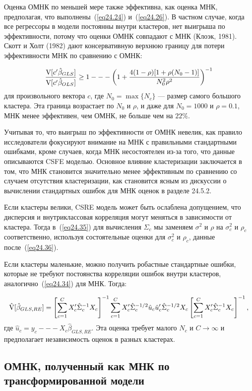 Оценка ОМНК по меньшей мере также эффективна, как оценка МНК, предполагая, что выполнены~(\ref{eq24.24}) и~(\ref{eq24.26}). В частном случае, когда все регрессоры в модели постоянны внутри кластеров, нет выигрыша по эффективности, потому что оценки ОМНК совпадают с МНК (Клоэк, 1981). Скотт и Холт (1982) дают консервативную верхнюю границу для потери эффективности МНК по сравнению с ОМНК:

$$
\frac{\mathrm{V}[c' \hat \beta_{GLS}]}{\mathrm{V}[c' \hat \beta_{OLS}]} \ge 1 --- \left( 1+ \frac{4(1-\rho)[1+\rho(N_0 -1)]}{N_0^2 \rho^2} \right)^{-1}
$$
для произвольного вектора $c$, где $N_0 = \max\{ N_c\}$ --- размер самого большого кластера. Эта граница возрастает по $N_0$ и $\rho$, и даже для $N_0 = 1000$ и $\rho = 0.1$, МНК менее эффективен, чем ОМНК, не больше чем на $22\%$. 

Учитывая то, что выигрыш по эффективности от ОМНК невелик, как правило исследователи фокусируют внимание на МНК с правильными стандартными ошибками, кроме случаев, когда МНК несостоятелен из-за того, что данные описываются CSFE моделью. Основное влияние кластеризации заключается в том, что МНК становится значительно менее эффективным по сравнению со случаем отсутствия кластеризации, как становится ясным из дискуссии о вычислении стандартных ошибок для МНК оценок в разделе 24.5.2. 

Если кластеры велики, CSRE модель может быть ослаблена допущением, что дисперсия и внутриклассовая корреляция могут меняться в зависимости от кластера. Тогда в~(\ref{eq24.35}) для вычисления $\Sigma_c$ мы заменяем $\sigma^2$ и $\rho$ на $\sigma^2_c$ и $\rho_c$ соответственно, используя состоятельные оценки для $\sigma^2_c$ и $\rho_c$, данные после~(\ref{eq24.36}). 

Если кластеры маленькие, можно получить робастные стандартные ошибки, которые не требуют постоянства корреляции ошибок внутри кластеров, аналогично~(\ref{eq24.34}) для МНК. Тогда:

$$
\hat {\mathrm{V}} [\hat \beta_{GLS,RE}] = \left[ \sum_{c=1}^C X'_c \hat \Sigma_c^{-1} X_c \right]^{-1} \sum_{c=1}^C  X'_c \hat \Sigma_c^{-1/2} \hat u_c \hat u'_c \hat \Sigma_c^{-1/2} X_c \left[ \sum_{c=1}^C X'_c \hat \Sigma_c^{-1} X_c \right]^{-1},
$$
где $\hat u_c = y_c --- X_c \hat \beta_{GLS,RE}$. Эта оценка требует малого $N_c$ и $C \to \infty$ и предполагает независимость оценок в разных кластерах. 

\subsection*{ОМНК, полученный как МНК по трансформированной модели}

